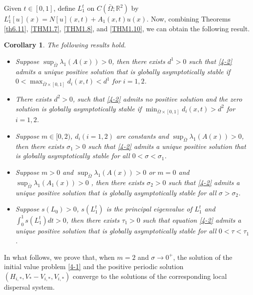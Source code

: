 \documentclass[11pt,reqno]{amsart}
\newtheorem{corollary}[theorem]{Corollary}
\numberwithin{equation}{section}
\begin{document}
Given $t\in[0,1]$, define $L_{1}^{t}$ on $C(\bar{\Omega};\mathbb{R}^{2})$ by $L_{1}^{t}[u](x) = N[u](x,t)+A_{1}(x,t)u(x)$. Now, combining Theorems \ref{th6.11}, \ref{THM1.7}, \ref{THM1.8}, and \ref{THM1.10}, we can obtain the following result.
\begin{corollary} The following results hold.
\begin{itemize}[leftmargin=0.8cm]
\item[(i)]
Suppose $ \sup_{\bar{\Omega}}\lambda_{1}(A(x)) > 0$, then there exists $d^{1}>0$ such that \eqref{4-2} admits a unique positive solution that is globally asymptotically stable if $0< \max_{\bar{\Omega}\times [0,1]}d_{i}(x,t) < d^{1}$ for $i=1,2$.

\item[(ii)]
There exists $d^{2}>0$, such that \eqref{4-2} admits no positive solution and the zero solution is globally asymptotically stable if $\min_{\bar{\Omega}\times[0,1]}d_{i}(x,t)>d^{2}$ for $i=1,2$.

\item[(iii)]
Suppose $m \in [0,2)$, $d_{i}(i=1,2)$ are constants and
$\sup_{\bar{\Omega}}\lambda_{1}(A(x)) > 0$, then there exists $\sigma_{1}>0$ such that \eqref{4-2} admits a unique positive solution that is globally asymptotically stable for all $0< \sigma < \sigma_{1}$.

\item[(iv)]
Suppose $m > 0$ and $ \sup_{\bar{\Omega}}\lambda_{1}(A(x)) > 0$ or $m=0$ and $ \sup_{\bar{\Omega}}\lambda_{1}(A_{1}(x)) > 0$ , then there exists $\sigma_{2}>0$ such that \eqref{4-2} admits a unique positive solution that is globally asymptotically stable for all $\sigma > \sigma_{2}$.

\item[(v)]
Suppose $s(L_{0})>0$, $s(L_{1}^{t})$ is the principal eigenvalue of $L_{1}^{t}$ and $\int_{0}^{1} s(L_{1}^{t}) dt > 0$, then there exists $\tau_{1}>0$ such that  equation \eqref{4-2} admits a unique positive solution that is globally asymptotically stable for all $0< \tau < \tau_{1}$.
\end{itemize}
\end{corollary}




In what follows, we prove that, when $m=2$ and $\sigma\to 0^{+}$, the solution of the initial value problem \eqref{4-1} and the positive periodic solution
$(H_{i,*},V_{*}-V_{i,*},V_{i,*})$ converge to the solutions of the corresponding local dispersal system.
\end{document}
